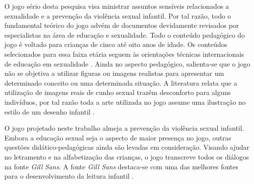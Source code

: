 O jogo sério desta pesquisa visa ministrar assuntos sensíveis relacionados a sexualidade e a prevenção da violência sexual infantil. Por tal razão, todo o fundamental teórico do jogo advém de documentos devidamente revisados por especialistas na área de educação e sexualidade. Todo o conteúdo pedagógico do jogo é voltado para crianças de cinco até oito anos de idade. Os conteúdos selecionados para essa faixa etária seguem às orientações técnicas internacionais de educação em sexualidade \cite{women2018international}. Ainda no aspecto pedagógico, salienta-se que o jogo não se objetiva a utilizar figuras ou imagens realistas para apresentar um determinado conceito ou uma determinada situação. A literatura relata que a utilização de imagens reais de cunho sexual trazêm desconforto para alguns indivíduos, por tal razão toda a arte utilizada no jogo assume uma ilustração no estilo de um desenho infantil \cite{jogo2020Albert}.


O jogo projetado neste trabalho almeja a prevenção da violência sexual infantil. Embora a educação sexual seja o aspecto de maior presença no jogo, outras questões didático-pedagógicas ainda são levadas em consideração. Visando ajudar no letramento e na alfabetização das crianças, o jogo transcreve todos os diálogos na fonte \textit{Gill Sans}. A fonte \textit{Gill Sans} destaca-se com uma das melhores fontes para o desenvolvimento da leitura infantil \cite{lourencco2011tipografia}. 



